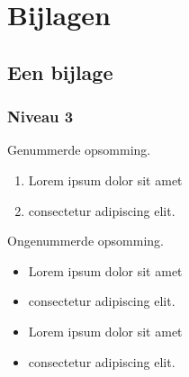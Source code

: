 
\section*{Bijlagen} %
\label{sec:een-titel}

\appendix

\renewcommand{\thesubsection}{\Alph{subsection}}

\subsection{Een bijlage} %
\label{sub:nog-een-titel}

\lipsum[1]

\subsubsection{Niveau 3}

Genummerde opsomming.

\begin{enumerate}
  \item Lorem ipsum dolor sit amet
  \item consectetur adipiscing elit.
\end{enumerate}

Ongenummerde opsomming.

\begin{itemize}
  \item Lorem ipsum dolor sit amet
  \item consectetur adipiscing elit.
  \item Lorem ipsum dolor sit amet
  \item consectetur adipiscing elit.
\end{itemize}

